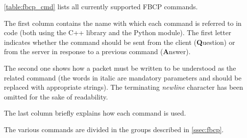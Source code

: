 \autoref{table:fbcp_cmd} lists all currently supported FBCP commands.

The first column contains the name with which each command is referred
to in code (both using the C++ library and the Python module).
The first letter indicates whether the command should be sent from the
client (\textbf{Q}uestion) or from the server in response to a previous
command (\textbf{A}nswer).

The second one shows how a packet must be written to be understood as
the related command (the words in italic are mandatory parameters and
should be replaced with appropriate strings). The terminating
\textit{newline} character has been omitted for the sake of readability.

The last column briefly explains how each command is used.

The various commands are divided in the groups described in
\autoref{ssec:fbcp}.

